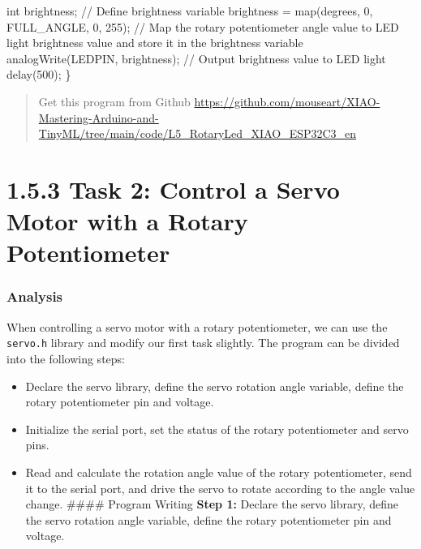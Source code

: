 \documentclass[
  letterpaper,
  DIV=11,
  numbers=noendperiod]{scrreprt}
\newenvironment{Shaded}{\begin{snugshade}}{\end{snugshade}}
\newcommand{\CommentTok}[1]{\textcolor[rgb]{0.37,0.37,0.37}{#1}}
\newcommand{\DataTypeTok}[1]{\textcolor[rgb]{0.68,0.00,0.00}{#1}}
\newcommand{\DecValTok}[1]{\textcolor[rgb]{0.68,0.00,0.00}{#1}}
\newcommand{\NormalTok}[1]{\textcolor[rgb]{0.00,0.23,0.31}{#1}}
\newcommand{\OperatorTok}[1]{\textcolor[rgb]{0.37,0.37,0.37}{#1}}
\providecommand{\tightlist}{%
  \setlength{\itemsep}{0pt}\setlength{\parskip}{0pt}}\usepackage{longtable,booktabs,array}
\begin{document}
\begin{Shaded}
\begin{Highlighting}[]
    \DataTypeTok{int}\NormalTok{ brightness}\OperatorTok{;} \CommentTok{// Define brightness variable}
\NormalTok{    brightness }\OperatorTok{=}\NormalTok{ map}\OperatorTok{(}\NormalTok{degrees}\OperatorTok{,} \DecValTok{0}\OperatorTok{,}\NormalTok{ FULL\_ANGLE}\OperatorTok{,} \DecValTok{0}\OperatorTok{,} \DecValTok{255}\OperatorTok{);} \CommentTok{// Map the rotary potentiometer angle value to LED light brightness value and store it in the brightness variable}
\NormalTok{    analogWrite}\OperatorTok{(}\NormalTok{LEDPIN}\OperatorTok{,}\NormalTok{ brightness}\OperatorTok{);} \CommentTok{// Output brightness value to LED light}
\NormalTok{    delay}\OperatorTok{(}\DecValTok{500}\OperatorTok{);}
\OperatorTok{\}}
\end{Highlighting}
\end{Shaded}

\begin{quote}
Get this program from Github
\url{https://github.com/mouseart/XIAO-Mastering-Arduino-and-TinyML/tree/main/code/L5_RotaryLed_XIAO_ESP32C3_en}
\end{quote}

\hypertarget{task-2-control-a-servo-motor-with-a-rotary-potentiometer}{%
\section*{1.5.3 Task 2: Control a Servo Motor with a Rotary
Potentiometer}\label{task-2-control-a-servo-motor-with-a-rotary-potentiometer}}


\hypertarget{analysis-1}{%
\subsubsection*{Analysis}\label{analysis-1}}

When controlling a servo motor with a rotary potentiometer, we can use
the \texttt{servo.h} library and modify our first task slightly. The
program can be divided into the following steps:

\begin{itemize}
\tightlist
\item
  Declare the servo library, define the servo rotation angle variable,
  define the rotary potentiometer pin and voltage.
\item
  Initialize the serial port, set the status of the rotary potentiometer
  and servo pins.
\item
  Read and calculate the rotation angle value of the rotary
  potentiometer, send it to the serial port, and drive the servo to
  rotate according to the angle value change. \#\#\#\# Program Writing
  \textbf{Step 1:} Declare the servo library, define the servo rotation
  angle variable, define the rotary potentiometer pin and voltage.
\end{itemize}
\end{document}
